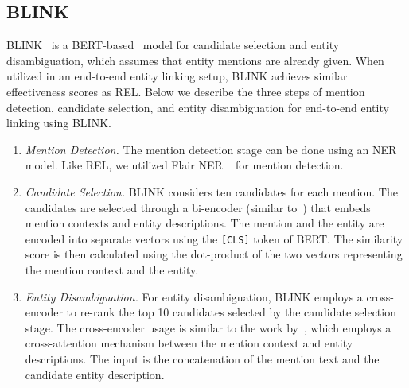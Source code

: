 \subsection{BLINK}
BLINK~\citep{blink} is a BERT-based~\citep{BERT} model for candidate selection and entity disambiguation, which assumes that entity mentions are already given. When utilized in an end-to-end entity linking setup, BLINK achieves similar effectiveness scores as REL. Below we describe the three steps of mention detection, candidate selection, and entity disambiguation for end-to-end entity linking using BLINK.

\begin{enumerate}
    \item \emph{Mention Detection.} The mention detection stage can be done using an NER model. Like REL, we utilized Flair NER ~\citep{flair} for mention detection.
	\item \emph{Candidate Selection.} BLINK considers ten candidates for each mention. The candidates are selected through a bi-encoder (similar to~\citet{poly-encoders}) that embeds mention contexts and entity descriptions. The mention and the entity are encoded into separate vectors using the \texttt{[CLS]} token of BERT. The similarity score is then calculated using the dot-product of the two vectors representing the mention context and the entity.  
	\item \emph{Entity Disambiguation.} For entity disambiguation, BLINK employs a cross-encoder to re-rank the top 10 candidates selected by the candidate selection stage. The cross-encoder usage is similar to the work by~\citet{poly-encoders}, which employs a cross-attention mechanism between the mention context and entity descriptions. The input is the concatenation of the mention text and the candidate entity description.    
\end{enumerate}

